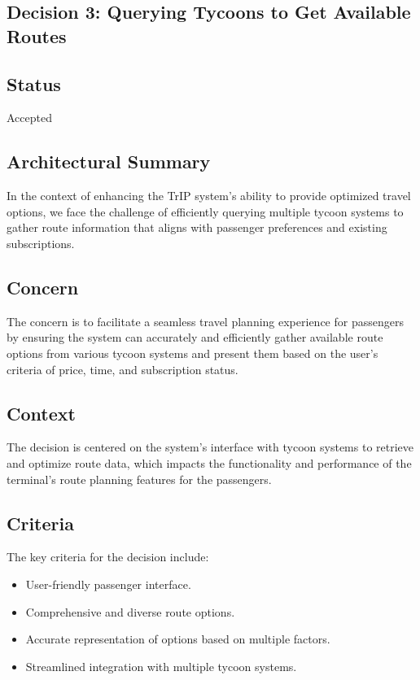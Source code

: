 \subsection{Decision 3: Querying Tycoons to Get Available Routes}

\subsection*{Status}
Accepted

\subsection*{Architectural Summary}
In the context of enhancing the TrIP system's ability to provide optimized travel options, we face the challenge of efficiently querying multiple tycoon systems to gather route information that aligns with passenger preferences and existing subscriptions.

\subsection*{Concern}
The concern is to facilitate a seamless travel planning experience for passengers by ensuring the system can accurately and efficiently gather available route options from various tycoon systems and present them based on the user's criteria of price, time, and subscription status.

\subsection*{Context}
The decision is centered on the system's interface with tycoon systems to retrieve and optimize route data, which impacts the functionality and performance of the terminal's route planning features for the passengers.

\subsection*{Criteria}
The key criteria for the decision include:
\begin{itemize}
    \item User-friendly passenger interface.
    \item Comprehensive and diverse route options.
    \item Accurate representation of options based on multiple factors.
    \item Streamlined integration with multiple tycoon systems.
\end{itemize}

